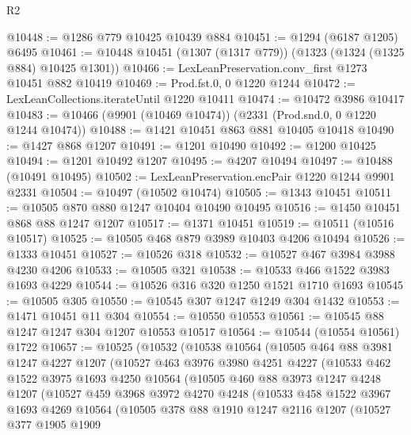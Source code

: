 \begin{lexlean}{R2}
\begin{coremodule}
@10448 := @1286 @779 @10425 @10439 @884
@10451 := @1294 (@6187 @1205) @6495
@10461 := @10448 @10451 (@1307 (@1317 @779)) (@1323 (@1324 (@1325 @884) @10425 @1301))
@10466 := LexLeanPreservation.conv_first @1273 @10451 @882 @10419
@10469 := Prod.fst.{0, 0} @1220 @1244
@10472 := LexLeanCollections.iterateUntil @1220 @10411
@10474 := @10472 @3986 @10417
@10483 := @10466 (@9901 (@10469 @10474)) (@2331 (Prod.snd.{0, 0} @1220 @1244 @10474))
@10488 := @1421 @10451 @863 @881 @10405 @10418
@10490 := @1427 @868 @1207
@10491 := @1201 @10490
@10492 := @1200 @10425
@10494 := @1201 @10492 @1207
@10495 := @4207 @10494
@10497 := @10488 (@10491 @10495)
@10502 := LexLeanPreservation.encPair @1220 @1244 @9901 @2331
@10504 := @10497 (@10502 @10474)
@10505 := @1343 @10451
@10511 := @10505 @870 @880 @1247 @10404 @10490 @10495
@10516 := @1450 @10451 @868 @88 @1247 @1207
@10517 := @1371 @10451
@10519 := @10511 (@10516 @10517)
@10525 := @10505 @468 @879 @3989 @10403 @4206 @10494
@10526 := @1333 @10451
@10527 := @10526 @318
@10532 := @10527 @467 @3984 @3988 @4230 @4206
@10533 := @10505 @321
@10538 := @10533 @466 @1522 @3983 @1693 @4229
@10544 := @10526 @316 @320 @1250 @1521 @1710 @1693
@10545 := @10505 @305
@10550 := @10545 @307 @1247 @1249 @304 @1432
@10553 := @1471 @10451 @11 @304
@10554 := @10550 @10553
@10561 := @10545 @88 @1247 @1247 @304 @1207 @10553 @10517
@10564 := @10544 (@10554 @10561) @1722
@10657 := @10525
    (@10532
      (@10538
        @10564
        (@10505
          @464
          @88
          @3981
          @1247
          @4227
          @1207
          (@10527
            @463
            @3976
            @3980
            @4251
            @4227
            (@10533
              @462
              @1522
              @3975
              @1693
              @4250
              @10564
              (@10505
                @460
                @88
                @3973
                @1247
                @4248
                @1207
                (@10527
                  @459
                  @3968
                  @3972
                  @4270
                  @4248
                  (@10533
                    @458
                    @1522
                    @3967
                    @1693
                    @4269
                    @10564
                    (@10505
                      @378
                      @88
                      @1910
                      @1247
                      @2116
                      @1207
                      (@10527
                        @377
                        @1905
                        @1909

\end{coremodule}
\end{lexlean}
